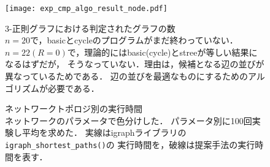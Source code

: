 \documentclass[11pt]{jarticle}
\begin{document}
\begin{figure}[H]
  \centering
  \texttt{[image: exp\_cmp\_algo\_result\_node.pdf]}
  \caption{3-正則グラフにおける判定されたグラフの数 \\
    $n=20$で，basicとcycleのプログラムがまだ終わっていない．
    $n=22(R=0)$で，理論的にはbasic(cycle)とstreeが等しい結果になるはずだが，
    そうなっていない．理由は，候補となる辺の並びが異なっているためである．
    辺の並びを最適なものにするためのアルゴリズムが必要である．
  }
  \label{fig:result-ext-nodes}
\end{figure}

\begin{figure}[H]
  \centering
  \hfill
  \caption{ネットワークトポロジ別の実行時間 \\
    ネットワークのパラメータで色分けした．
    パラメータ別に100回実験し平均を求めた．
    実線はigraphライブラリの\texttt{igraph\_shortest\_paths()}の
    実行時間を，破線は提案手法の実行時間を表す．
  }
  \label{fig:result}
\end{figure}
\end{document}
